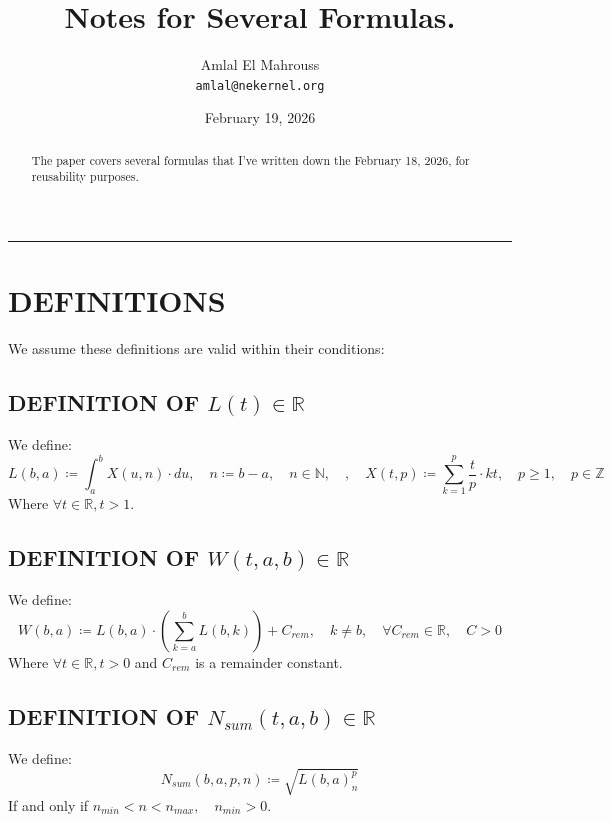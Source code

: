 \documentclass[11pt, a4paper]{article}
\title{Notes for Several Formulas.}
\author{Amlal El Mahrouss\\\texttt{amlal@nekernel.org}}
\date{February 19, 2026}
\begin{document}
\maketitle

\begin{center}
	\rule[0.01cm]{17cm}{0.01cm}
\end{center}

\begin{abstract}
\begin{center}
    The paper covers several formulas that I've written down the February 18, 2026, for reusability purposes.
\end{center}
\end{abstract}

\section{DEFINITIONS}

We assume these definitions are valid within their conditions:

\subsection{DEFINITION OF $L(t) \in \mathbb{R}$}
We define:
\begin{equation}
    L(b, a) \coloneqq \int_{a}^{b}X(u, n)\cdot du, \quad n \coloneqq b - a, \quad n \in \mathbb{N}, \quad, \quad X(t, p) \coloneqq \sum_{k=1}^{p}\frac{t}{p}\cdot kt, \quad p \geq 1, \quad p \in \mathbb{Z}
\end{equation}
Where $\forall t \in \mathbb{R}, t > 1$.

\subsection{DEFINITION OF $W(t, a, b) \in \mathbb{R}$}
We define:
\begin{equation}
    W(b, a) \coloneqq L(b, a)\cdot(\sum_{k=a}^{b} L(b, k)) +C_{rem}, \quad k \neq b,\quad \forall C_{rem} \in \mathbb{R}, \quad C > 0
\end{equation}
Where $\forall t \in \mathbb{R}, t > 0$ and $C_{rem}$ is a remainder constant.

\subsection{DEFINITION OF $N_{sum}(t, a, b) \in \mathbb{R}$}

We define:
\begin{equation}
    N_{sum}(b, a, p, n) \coloneqq \sqrt{L(b, a)^p_{n}}
\end{equation}
If and only if $n_{min} < n < n_{max}, \quad n_{min} > 0$.
\end{document}
